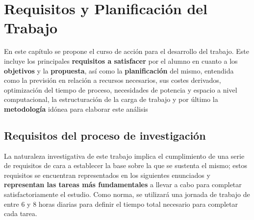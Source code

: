 \chapter{Requisitos y Planificación del Trabajo}

En este capítulo se propone el curso de acción para el desarrollo del trabajo. Este incluye los principales \textbf{requisitos a satisfacer} por el alumno en cuanto a los \textbf{objetivos} y la \textbf{propuesta}, así como la \textbf{planificación} del mismo, entendida como la previsión en relación a recursos necesarios, sus costes derivados, optimización del tiempo de proceso, necesidades de potencia y espacio a nivel computacional, la estructuración de la carga de trabajo y por último la \textbf{metodología} idónea para elaborar este análisis

\section{Requisitos del proceso de investigación}

La naturaleza investigativa de este trabajo implica el cumplimiento de una serie de requisitos de cara a establecer la base sobre la que se sustenta el mismo; estos requisitos se encuentran representados en los siguientes enunciados y \textbf{representan las tareas más fundamentales }a llevar a cabo para completar satisfactoriamente el estudio. Como norma, se utilizará una jornada de trabajo de entre 6 y 8 horas diarias para definir el tiempo total necesario para completar cada tarea.

